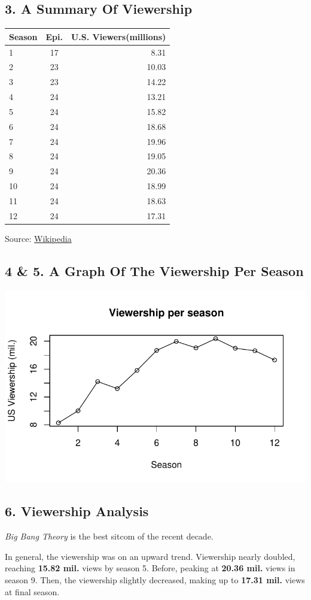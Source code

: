 \documentclass[
  letterpaper,
  DIV=11,
  numbers=noendperiod]{scrartcl}
\begin{document}
\hypertarget{a-summary-of-viewership}{%
\subsection{3. A Summary Of Viewership}\label{a-summary-of-viewership}}

\begin{longtable}[]{@{}lcr@{}}
\toprule()
Season & Epi. & U.S. Viewers(millions) \\
\midrule()
\endhead
1 & 17 & 8.31 \\
2 & 23 & 10.03 \\
3 & 23 & 14.22 \\
4 & 24 & 13.21 \\
5 & 24 & 15.82 \\
6 & 24 & 18.68 \\
7 & 24 & 19.96 \\
8 & 24 & 19.05 \\
9 & 24 & 20.36 \\
10 & 24 & 18.99 \\
11 & 24 & 18.63 \\
12 & 24 & 17.31 \\
\bottomrule()
\end{longtable}

Source:
\href{https://en.wikipedia.org/wiki/The_Big_Bang_Theory}{Wikipedia}

\hypertarget{a-graph-of-the-viewership-per-season}{%
\subsection{4 \& 5. A Graph Of The Viewership Per
Season}\label{a-graph-of-the-viewership-per-season}}

\includegraphics{Assignment2_files/figure-pdf/unnamed-chunk-1-1.pdf}

\hypertarget{viewership-analysis}{%
\subsection{6. Viewership Analysis}\label{viewership-analysis}}

\emph{Big Bang Theory} is the best sitcom of the recent decade.

In general, the viewership was on an upward trend. Viewership nearly
doubled, reaching \textbf{15.82 mil.} views by season 5. Before, peaking
at \textbf{20.36 mil.} views in season 9. Then, the viewership slightly
decreased, making up to \textbf{17.31 mil.} views at final season.
\end{document}
